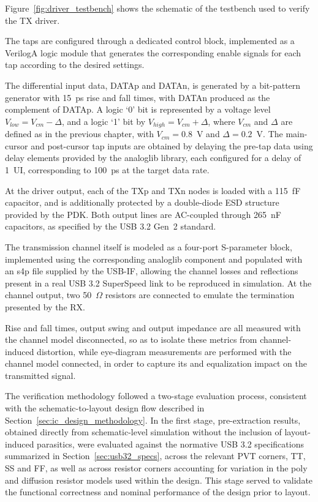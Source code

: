 Figure~\ref{fig:driver_testbench} shows the schematic of the testbench used to verify the \ac{TX} driver.

The taps are configured through a dedicated control block, implemented as a VerilogA logic module that generates the corresponding enable signals for each tap according to the desired settings. 

The differential input data, DATAp and DATAn, is generated by a bit-pattern generator with 15~ps rise and fall times, with DATAn produced as the complement of DATAp. A logic `0' bit is represented by a voltage level $V_{low} = V_{cm} - \Delta$, and a logic `1' bit by $V_{high} = V_{cm} + \Delta$, where $V_{cm}$ and $\Delta$ are defined as in the previous chapter, with $V_{cm} = 0.8$~V and $\Delta = 0.2$~V. The main-cursor and post-cursor tap inputs are obtained by delaying the pre-tap data using delay elements provided by the analoglib library, each configured for a delay of 1~\ac{UI}, corresponding to 100~ps at the target data rate. 

At the driver output, each of the TXp and TXn nodes is loaded with a 115~fF capacitor, and is additionally protected by a double-diode \ac{ESD} structure provided by the \ac{PDK}. Both output lines are \ac{AC}-coupled through 265~nF capacitors, as specified by the \ac{USB} 3.2 Gen~2 standard. 

The transmission channel itself is modeled as a four-port S-parameter block, implemented using the corresponding analoglib component and populated with an s4p file supplied by the \ac{USB-IF}, allowing the channel losses and reflections present in a real \ac{USB} 3.2 SuperSpeed link to be reproduced in simulation. At the channel output, two 50~$\Omega$ resistors are connected to emulate the termination presented by the \ac{RX}. 

Rise and fall times, output swing and output impedance are all measured with the channel model disconnected, so as to isolate these metrics from channel-induced distortion, while eye-diagram measurements are performed with the channel model connected, in order to capture its and equalization impact on the transmitted signal.

The verification methodology followed a two-stage evaluation process, consistent with the schematic-to-layout design flow described in Section~\ref{sec:ic_design_methodology}. In the first stage, pre-extraction results, obtained directly from schematic-level simulation without the inclusion of layout-induced parasitics, were evaluated against the normative \ac{USB} 3.2 specifications summarized in Section~\ref{sec:usb32_specs}, across the relevant \ac{PVT} corners, \ac{TT}, \ac{SS} and \ac{FF}, as well as across resistor corners accounting for variation in the poly and diffusion resistor models used within the design. This stage served to validate the functional correctness and nominal performance of the design prior to layout.

